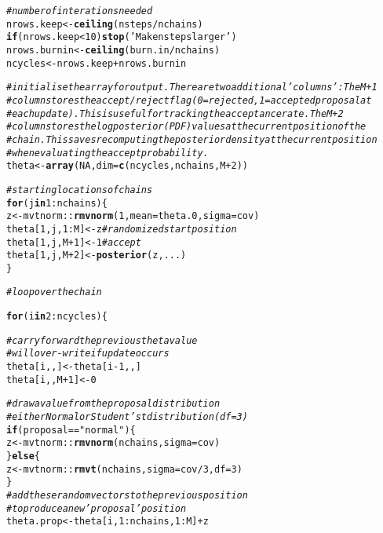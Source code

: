 \documentclass{article}\usepackage[]{graphicx}\usepackage[]{color}
\makeatletter
\newcommand{\hlnum}[1]{\textcolor[rgb]{0.686,0.059,0.569}{#1}}%
\newcommand{\hlstr}[1]{\textcolor[rgb]{0.192,0.494,0.8}{#1}}%
\newcommand{\hlcom}[1]{\textcolor[rgb]{0.678,0.584,0.686}{\textit{#1}}}%
\newcommand{\hlopt}[1]{\textcolor[rgb]{0,0,0}{#1}}%
\newcommand{\hlstd}[1]{\textcolor[rgb]{0.345,0.345,0.345}{#1}}%
\newcommand{\hlkwa}[1]{\textcolor[rgb]{0.161,0.373,0.58}{\textbf{#1}}}%
\newcommand{\hlkwb}[1]{\textcolor[rgb]{0.69,0.353,0.396}{#1}}%
\newcommand{\hlkwc}[1]{\textcolor[rgb]{0.333,0.667,0.333}{#1}}%
\newcommand{\hlkwd}[1]{\textcolor[rgb]{0.737,0.353,0.396}{\textbf{#1}}}%
\newenvironment{kframe}{%
 \def\at@end@of@kframe{}%
 \ifinner\ifhmode%
  \def\at@end@of@kframe{\end{minipage}}%
  \begin{minipage}{\columnwidth}%
 \fi\fi%
 \def\FrameCommand##1{\hskip\@totalleftmargin \hskip-\fboxsep
 \colorbox{shadecolor}{##1}\hskip-\fboxsep
     \hskip-\linewidth \hskip-\@totalleftmargin \hskip\columnwidth}%
 \MakeFramed {\advance\hsize-\width
   \@totalleftmargin\z@ \linewidth\hsize
   \@setminipage}}%
 {\par\unskip\endMakeFramed%
 \at@end@of@kframe}
\newenvironment{knitrout}{}{} %
\makeatother
\begin{document}
\begin{knitrout}
\begin{kframe}
\begin{alltt}
  \hlcom{# number of interations needed}
  \hlstd{nrows.keep} \hlkwb{<-} \hlkwd{ceiling}\hlstd{(nsteps} \hlopt{/} \hlstd{nchains)}
  \hlkwa{if} \hlstd{(nrows.keep} \hlopt{<} \hlnum{10}\hlstd{)} \hlkwd{stop}\hlstd{(}\hlstr{'Make nsteps larger'}\hlstd{)}
  \hlstd{nrows.burnin} \hlkwb{<-} \hlkwd{ceiling}\hlstd{(burn.in} \hlopt{/} \hlstd{nchains)}
  \hlstd{ncycles} \hlkwb{<-} \hlstd{nrows.keep} \hlopt{+} \hlstd{nrows.burnin}

  \hlcom{# initialise the array for output. There are two additional 'columns': The M+1}
  \hlcom{# column stores the accept/reject flag (0=rejected, 1=accepted proposal at }
  \hlcom{# each update). This is useful for tracking the acceptance rate. The M+2 }
  \hlcom{# column stores the log posterior (PDF) values at the current position of the }
  \hlcom{# chain. This saves recomputing the posterior density at the current position}
  \hlcom{# when evaluating the accept probability.}
  \hlstd{theta} \hlkwb{<-} \hlkwd{array}\hlstd{(}\hlnum{NA}\hlstd{,} \hlkwc{dim}\hlstd{=}\hlkwd{c}\hlstd{(ncycles, nchains, M}\hlopt{+}\hlnum{2}\hlstd{))}

  \hlcom{# starting locations of chains}
  \hlkwa{for} \hlstd{(j} \hlkwa{in} \hlnum{1}\hlopt{:}\hlstd{nchains) \{}
     \hlstd{z} \hlkwb{<-} \hlstd{mvtnorm}\hlopt{::}\hlkwd{rmvnorm}\hlstd{(}\hlnum{1}\hlstd{,} \hlkwc{mean} \hlstd{= theta.0,} \hlkwc{sigma} \hlstd{= cov)}
     \hlstd{theta[}\hlnum{1}\hlstd{, j,} \hlnum{1}\hlopt{:}\hlstd{M]} \hlkwb{<-} \hlstd{z}  \hlcom{# randomized start position}
     \hlstd{theta[}\hlnum{1}\hlstd{, j, M}\hlopt{+}\hlnum{1}\hlstd{]} \hlkwb{<-} \hlnum{1}  \hlcom{# accept}
     \hlstd{theta[}\hlnum{1}\hlstd{, j, M}\hlopt{+}\hlnum{2}\hlstd{]} \hlkwb{<-} \hlkwd{posterior}\hlstd{(z, ...)}
  \hlstd{\}}

  \hlcom{# loop over the chain}

  \hlkwa{for} \hlstd{(i} \hlkwa{in} \hlnum{2}\hlopt{:}\hlstd{ncycles) \{}

    \hlcom{# carry forward the previous theta value}
    \hlcom{# will over-write if update occurs}
    \hlstd{theta[i, , ]} \hlkwb{<-} \hlstd{theta[i}\hlopt{-}\hlnum{1}\hlstd{, , ]}
    \hlstd{theta[i, , M}\hlopt{+}\hlnum{1}\hlstd{]} \hlkwb{<-} \hlnum{0}

    \hlcom{# draw a value from the proposal distribution}
    \hlcom{# either Normal or Student's t distribution (df=3)}
    \hlkwa{if} \hlstd{(proposal} \hlopt{==} \hlstr{"normal"}\hlstd{) \{}
      \hlstd{z} \hlkwb{<-} \hlstd{mvtnorm}\hlopt{::}\hlkwd{rmvnorm}\hlstd{(nchains,} \hlkwc{sigma} \hlstd{= cov)}
    \hlstd{\}} \hlkwa{else} \hlstd{\{}
      \hlstd{z} \hlkwb{<-} \hlstd{mvtnorm}\hlopt{::}\hlkwd{rmvt}\hlstd{(nchains,} \hlkwc{sigma} \hlstd{= cov}\hlopt{/}\hlnum{3}\hlstd{,} \hlkwc{df} \hlstd{=} \hlnum{3}\hlstd{)}
    \hlstd{\}}
    \hlcom{# add these random vectors to the previous position}
    \hlcom{# to produce a new 'proposal' position}
    \hlstd{theta.prop} \hlkwb{<-} \hlstd{theta[i,} \hlnum{1}\hlopt{:}\hlstd{nchains,} \hlnum{1}\hlopt{:}\hlstd{M]} \hlopt{+} \hlstd{z}


\end{alltt}
\end{kframe}
\end{knitrout}
\end{document}
